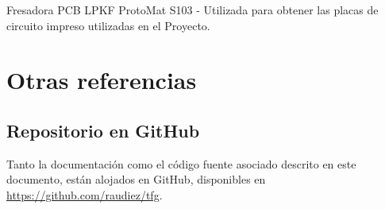     Fresadora PCB LPKF ProtoMat S103 - Utilizada para obtener las placas de circuito impreso utilizadas en el Proyecto.
    
\section{Otras referencias}

    \subsection{Repositorio en GitHub}
    \label{sec:repogithub}
    
    Tanto la documentación como el código fuente asociado descrito en este documento, están alojados en GitHub, disponibles en \url{https://github.com/raudiez/tfg}.